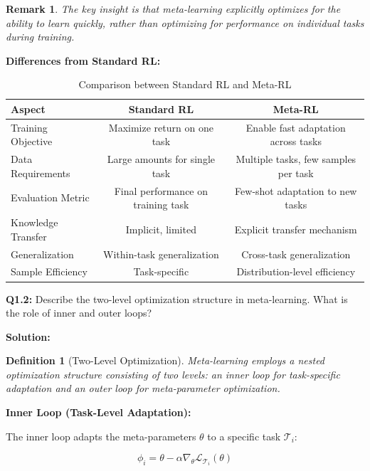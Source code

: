 \documentclass[12pt]{article}
\newcommand{\ieee}[1]{\textcolor{IEEEBlue}{\textbf{#1}}}
\newtheorem{definition}{Definition}
\newtheorem{remark}{Remark}
\begin{document}
{{			\begin{remark}
			The key insight is that meta-learning explicitly optimizes for the ability to learn quickly, rather than optimizing for performance on individual tasks during training.
			\end{remark}
			
			\ieee{Differences from Standard RL:}
			
			\begin{table}[H]
			\centering
			\caption{Comparison between Standard RL and Meta-RL}
			\begin{tabular}{@{}lcc@{}}
			\toprule
			\textbf{Aspect} & \textbf{Standard RL} & \textbf{Meta-RL} \\
			\midrule
			Training Objective & Maximize return on one task & Enable fast adaptation across tasks \\
			Data Requirements & Large amounts for single task & Multiple tasks, few samples per task \\
			Evaluation Metric & Final performance on training task & Few-shot adaptation to new tasks \\
			Knowledge Transfer & Implicit, limited & Explicit transfer mechanism \\
			Generalization & Within-task generalization & Cross-task generalization \\
			Sample Efficiency & Task-specific & Distribution-level efficiency \\
			\bottomrule
			\end{tabular}
			\label{tab:standard_vs_meta_rl}
			\end{table}
			
			\textbf{Q1.2:} Describe the two-level optimization structure in meta-learning. What is the role of inner and outer loops?
			
			\textbf{Solution:}
			
			\begin{definition}[Two-Level Optimization]
			Meta-learning employs a nested optimization structure consisting of two levels: an inner loop for task-specific adaptation and an outer loop for meta-parameter optimization.
			\end{definition}
			
			\ieee{Inner Loop (Task-Level Adaptation):}
			
			The inner loop adapts the meta-parameters $\theta$ to a specific task $\mathcal{T}_i$:
			
			\begin{equation}
			\phi_i = \theta - \alpha \nabla_\theta \mathcal{L}_{\mathcal{T}_i}(\theta)
			\end{equation}
			
}}
\end{document}
